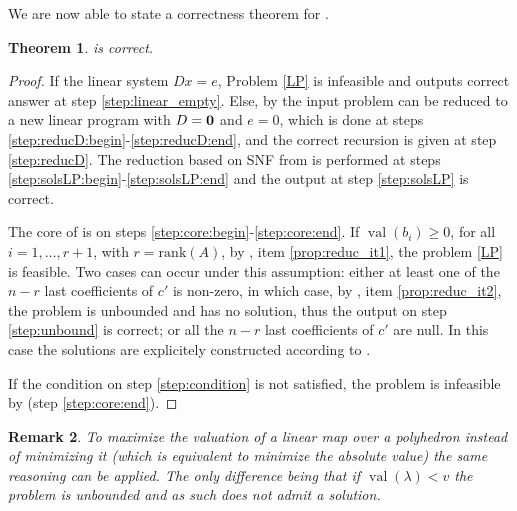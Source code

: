 \documentclass[a4paper,oneside,11pt]{article}
\newtheorem{theorem}{Theorem}[section]
\newtheorem{remark}[theorem]{Remark}
\DeclareMathOperator{\val}{val}
\begin{document}
We are now able to state a correctness theorem for .
  
\begin{theorem}  is correct.
\end{theorem}
\begin{proof}
  If the linear system $Dx=e$, Problem \eqref{LP} is infeasible
  and  outputs correct answer at step \ref{step:linear_empty}.
  Else, by  the input problem can be reduced to a new linear
  program with $D={\bf 0}$ and $e=0$, which is done at steps
  \ref{step:reducD:begin}-\ref{step:reducD:end},
  and the correct recursion is given at step \ref{step:reducD}.
  The reduction based on SNF from  is performed at
  steps \ref{step:solsLP:begin}-\ref{step:solsLP:end} and the output
  at step \ref{step:solsLP} is correct.
  
  The core of  is on steps \ref{step:core:begin}-\ref{step:core:end}.
  If $\val(b_i) \geq 0$, for all $i=1,\ldots,r+1$, with $r = \mathrm{rank}(A)$,
  by , item \ref{prop:reduc_it1}, the problem \eqref{LP} is feasible.
  Two cases can occur under this assumption:
  either at least one of the $n-r$ last coefficients of $c'$ is non-zero,
  in which case,
  by , item \ref{prop:reduc_it2}, the problem is
  unbounded and has no solution, thus the output on step \ref{step:unbound} is correct;
  or all the $n-r$ last coefficients of $c'$ are null. In this case the solutions
  are explicitely constructed according to .

  If the condition on step \ref{step:condition} is not satisfied, the problem
  is infeasible by  (step \ref{step:core:end}).
\end{proof}


\begin{remark}
  To maximize the valuation of a linear map over a polyhedron instead of minimizing it 
  (which is equivalent to minimize the absolute value) the same reasoning can be applied. 
  The only difference being that if $\val\left( \lambda\right) < v$ the problem is unbounded
  and as such does not admit a solution. 
\end{remark}
\end{document}
